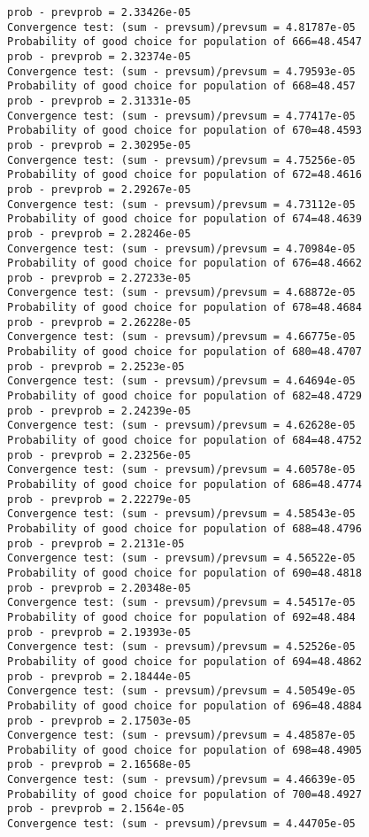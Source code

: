 \documentclass[11pt,onecolumn]{article}
\begin{document}
\begin{verbatim}
prob - prevprob = 2.33426e-05
Convergence test: (sum - prevsum)/prevsum = 4.81787e-05
Probability of good choice for population of 666=48.4547
prob - prevprob = 2.32374e-05
Convergence test: (sum - prevsum)/prevsum = 4.79593e-05
Probability of good choice for population of 668=48.457
prob - prevprob = 2.31331e-05
Convergence test: (sum - prevsum)/prevsum = 4.77417e-05
Probability of good choice for population of 670=48.4593
prob - prevprob = 2.30295e-05
Convergence test: (sum - prevsum)/prevsum = 4.75256e-05
Probability of good choice for population of 672=48.4616
prob - prevprob = 2.29267e-05
Convergence test: (sum - prevsum)/prevsum = 4.73112e-05
Probability of good choice for population of 674=48.4639
prob - prevprob = 2.28246e-05
Convergence test: (sum - prevsum)/prevsum = 4.70984e-05
Probability of good choice for population of 676=48.4662
prob - prevprob = 2.27233e-05
Convergence test: (sum - prevsum)/prevsum = 4.68872e-05
Probability of good choice for population of 678=48.4684
prob - prevprob = 2.26228e-05
Convergence test: (sum - prevsum)/prevsum = 4.66775e-05
Probability of good choice for population of 680=48.4707
prob - prevprob = 2.2523e-05
Convergence test: (sum - prevsum)/prevsum = 4.64694e-05
Probability of good choice for population of 682=48.4729
prob - prevprob = 2.24239e-05
Convergence test: (sum - prevsum)/prevsum = 4.62628e-05
Probability of good choice for population of 684=48.4752
prob - prevprob = 2.23256e-05
Convergence test: (sum - prevsum)/prevsum = 4.60578e-05
Probability of good choice for population of 686=48.4774
prob - prevprob = 2.22279e-05
Convergence test: (sum - prevsum)/prevsum = 4.58543e-05
Probability of good choice for population of 688=48.4796
prob - prevprob = 2.2131e-05
Convergence test: (sum - prevsum)/prevsum = 4.56522e-05
Probability of good choice for population of 690=48.4818
prob - prevprob = 2.20348e-05
Convergence test: (sum - prevsum)/prevsum = 4.54517e-05
Probability of good choice for population of 692=48.484
prob - prevprob = 2.19393e-05
Convergence test: (sum - prevsum)/prevsum = 4.52526e-05
Probability of good choice for population of 694=48.4862
prob - prevprob = 2.18444e-05
Convergence test: (sum - prevsum)/prevsum = 4.50549e-05
Probability of good choice for population of 696=48.4884
prob - prevprob = 2.17503e-05
Convergence test: (sum - prevsum)/prevsum = 4.48587e-05
Probability of good choice for population of 698=48.4905
prob - prevprob = 2.16568e-05
Convergence test: (sum - prevsum)/prevsum = 4.46639e-05
Probability of good choice for population of 700=48.4927
prob - prevprob = 2.1564e-05
Convergence test: (sum - prevsum)/prevsum = 4.44705e-05

\end{verbatim}
\end{document}
